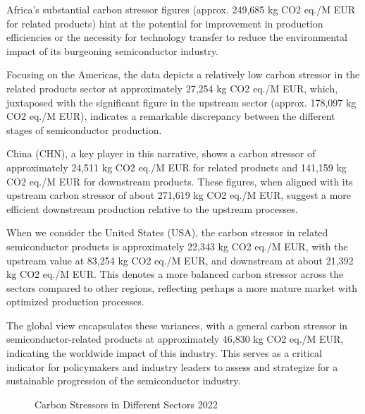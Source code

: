 Africa's substantial carbon stressor figures (approx. 249,685 kg CO2 eq./M EUR for related products) hint at the potential for improvement in production efficiencies or the necessity for technology transfer to reduce the environmental impact of its burgeoning semiconductor industry.

Focusing on the Americas, the data depicts a relatively low carbon stressor in the related products sector at approximately 27,254 kg CO2 eq./M EUR, which, juxtaposed with the significant figure in the upstream sector (approx. 178,097 kg CO2 eq./M EUR), indicates a remarkable discrepancy between the different stages of semiconductor production.

China (CHN), a key player in this narrative, shows a carbon stressor of approximately 24,511 kg CO2 eq./M EUR for related products and 141,159 kg CO2 eq./M EUR for downstream products. These figures, when aligned with its upstream carbon stressor of about 271,619 kg CO2 eq./M EUR, suggest a more efficient downstream production relative to the upstream processes.

When we consider the United States (USA), the carbon stressor in related semiconductor products is approximately 22,343 kg CO2 eq./M EUR, with the upstream value at 83,254 kg CO2 eq./M EUR, and downstream at about 21,392 kg CO2 eq./M EUR. This denotes a more balanced carbon stressor across the sectors compared to other regions, reflecting perhaps a more mature market with optimized production processes.

The global view encapsulates these variances, with a general carbon stressor in semiconductor-related products at approximately 46,830 kg CO2 eq./M EUR, indicating the worldwide impact of this industry. This serves as a critical indicator for policymakers and industry leaders to assess and strategize for a sustainable progression of the semiconductor industry.
\ifincludefigures
\begin{figure}
 \centering
 \caption{Carbon Stressors in Different Sectors 2022}\label{fig:Carbon Stressor in Different Sectors 2022}
\end{figure}
\fi
